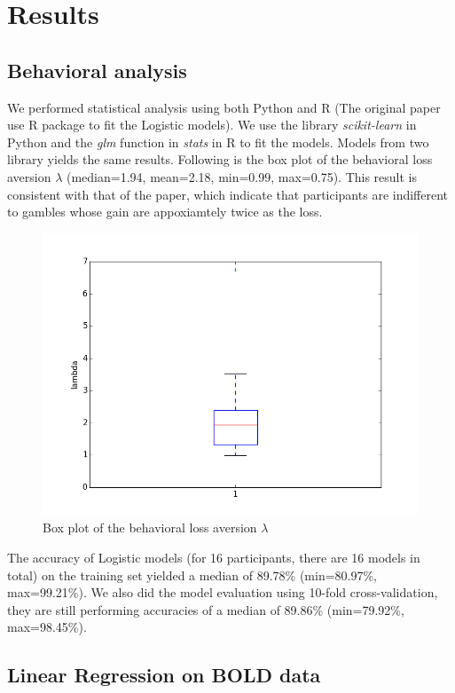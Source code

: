 \section{Results}

\subsection{Behavioral analysis}

We performed statistical analysis using both Python and R (The original paper 
use R package to fit the Logistic models). We use the library 
\emph{scikit-learn} in Python and the \emph{glm} function in \emph{stats} 
in R to fit the models. Models from two library yields the same results. 
Following is the box plot of the behavioral loss aversion $\lambda$ 
(median=1.94, mean=2.18, min=0.99, max=0.75). This result is consistent with 
that of the paper, which indicate that participants are indifferent to gambles 
whose gain are appoxiamtely twice as the loss. 
\begin{figure}[H]
\caption{Box plot of the behavioral loss aversion $\lambda$ }
    \centering
        \includegraphics[scale=0.35]{figures/lambda_boxplot.png}
\end{figure}
The accuracy of Logistic models (for 16 participants, there are 16 models in 
total) on the training set yielded a median of 89.78\% (min=80.97\%, 
max=99.21\%). We also did the model evaluation using 10-fold cross-validation, 
they are still performing accuracies of a median of 89.86\% (min=79.92\%, 
max=98.45\%).


\subsection{Linear Regression on BOLD data}

